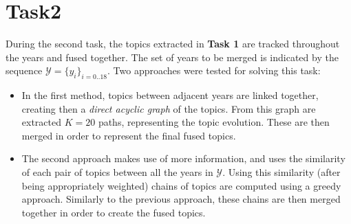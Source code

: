 \newpage
\newcommand{\CandidateChain}{\texttt{\color{AlgProcedureColor}candidate\textunderscore{}chain} }
\section{Task2}
During the second task,  the topics extracted in \textbf{Task 1}  are tracked throughout the years and fused together. The set of years to be merged  is indicated by the sequence $\mathcal Y = \{y_i\}_{i=0..18}$.
Two approaches were tested for solving this task:
\begin{itemize}
\item In the first method, topics between adjacent years are linked together, creating then a \textit{direct acyclic graph} of the topics. From this graph are extracted $K=20$ paths, representing the topic evolution. These are then merged in order to represent the final fused topics.
\item The second approach makes use of more information, and uses the similarity of each pair of topics between all the years in $\mathcal Y$. Using this similarity (after being appropriately weighted) chains of topics are computed using a greedy approach. Similarly to the previous approach, these chains are then merged together in order to create the fused topics.
\end{itemize}

